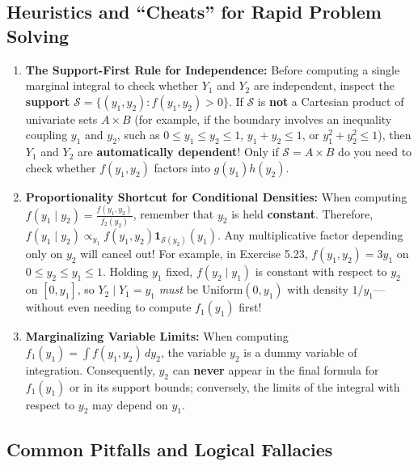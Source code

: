 \documentclass[11pt, letterpaper]{article}
\theoremstyle{definition}
\theoremstyle{remark}
\begin{document}
\subsection{Heuristics and ``Cheats'' for Rapid Problem Solving}

\begin{enumerate}
    \item \textbf{The Support-First Rule for Independence:} Before computing a single marginal integral to check whether $Y_1$ and $Y_2$ are independent, inspect the \textbf{support} $\mathcal{S} = \{(y_1, y_2) : f(y_1, y_2) > 0\}$. If $\mathcal{S}$ is \textbf{not} a Cartesian product of univariate sets $A \times B$ (for example, if the boundary involves an inequality coupling $y_1$ and $y_2$, such as $0 \le y_1 \le y_2 \le 1$, $y_1 + y_2 \le 1$, or $y_1^2 + y_2^2 \le 1$), then $Y_1$ and $Y_2$ are \textbf{automatically dependent}! Only if $\mathcal{S} = A \times B$ do you need to check whether $f(y_1, y_2)$ factors into $g(y_1)h(y_2)$.
    \item \textbf{Proportionality Shortcut for Conditional Densities:} When computing $f(y_1 \mid y_2) = \frac{f(y_1, y_2)}{f_2(y_2)}$, remember that $y_2$ is held \textbf{constant}. Therefore, $f(y_1 \mid y_2) \propto_{y_1} f(y_1, y_2) \mathbf{1}_{\mathcal{S}(y_2)}(y_1)$. Any multiplicative factor depending only on $y_2$ will cancel out! For example, in Exercise 5.23, $f(y_1, y_2) = 3y_1$ on $0 \le y_2 \le y_1 \le 1$. Holding $y_1$ fixed, $f(y_2 \mid y_1)$ is constant with respect to $y_2$ on $[0, y_1]$, so $Y_2 \mid Y_1 = y_1$ \textit{must} be $\text{Uniform}(0, y_1)$ with density $1/y_1$—without even needing to compute $f_1(y_1)$ first!
    \item \textbf{Marginalizing Variable Limits:} When computing $f_1(y_1) = \int f(y_1, y_2) \, dy_2$, the variable $y_2$ is a dummy variable of integration. Consequently, $y_2$ can \textbf{never} appear in the final formula for $f_1(y_1)$ or in its support bounds; conversely, the limits of the integral with respect to $y_2$ may depend on $y_1$.
\end{enumerate}

\subsection{Common Pitfalls and Logical Fallacies}
\end{document}
